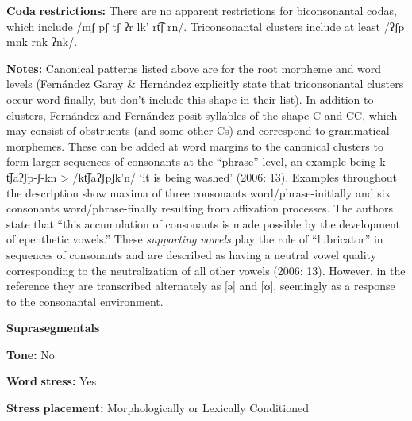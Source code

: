 \begin{styleBody}
\textbf{Coda} \textbf{restrictions:} There are no apparent restrictions for biconsonantal codas, which include /mʃ pʃ tʃ ʔr lk' rt͡ʃ rn/. Triconsonantal clusters include at least /ʔʃp mnk rnk ʔnk/.
\end{styleBody}

\begin{styleBody}
\textbf{Notes:} Canonical patterns listed above are for the root morpheme and word levels (Fernández Garay \& Hernández explicitly state that triconsonantal clusters occur word-finally, but don’t include this shape in their list). In addition to clusters, Fernández \citet{Garay1998} and Fernández \citet{GarayHernández2006} posit syllables of the shape C and CC, which may consist of obstruents (and some other Cs) and correspond to grammatical morphemes. These can be added at word margins to the canonical clusters to form larger sequences of consonants at the “phrase” level, an example being k{}-t͡ʃaʔʃp{}-ʃ{}-kn > /kt͡ʃaʔʃpʃk’n/ ‘it is being washed’ (2006: 13). Examples throughout the description show maxima of three consonants word/phrase-initially and six consonants word/phrase-finally resulting from affixation processes. The authors state that “this accumulation of consonants is made possible by the development of epenthetic vowels.” These \textit{supporting} \textit{vowels} play the role of “lubricator” in sequences of consonants and are described as having a neutral vowel quality corresponding to the neutralization of all other vowels (2006: 13). However, in the  reference they are transcribed alternately as [ə] and [ʊ], seemingly as a response to the consonantal environment.
\end{styleBody}

\begin{styleBody}
\textbf{Suprasegmentals}
\end{styleBody}

\begin{styleBody}
\textbf{Tone:} No
\end{styleBody}

\begin{styleBody}
\textbf{Word} \textbf{stress:} Yes
\end{styleBody}

\begin{styleBody}
\textbf{Stress} \textbf{placement:} Morphologically or Lexically Conditioned
\end{styleBody}

